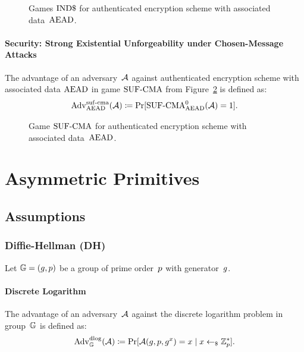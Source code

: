\documentclass[a4paper,orivec]{llncs}
\begin{document}
\begin{figure}[!ht]
    \centering
    \nicoresetlinenr%
    \fbox{%
        \scalebox{\codescalefactor}{%
        }%
    }
    \caption{%
        Games ${\mathrm{IND}\$}$ for authenticated encryption scheme with associated data~$\mathrm{AEAD}$.
    }
    \label{fig:sym:aenc:indd}
\end{figure}

\paragraph{Security: Strong Existential Unforgeability under Chosen-Message Attacks}
The advantage of an adversary~$\mathcal{A}$ against authenticated encryption scheme with associated data $\mathrm{AEAD}$ in game ${\mathrm{SUF}\text{-}\mathrm{CMA}}$ from Figure~\ref{fig:sym:aenc:suf} is defined as:
\[
\mathrm{Adv}_{\mathrm{AEAD}}^{\mathrm{suf}\text{-}\mathrm{cma}}(\mathcal{A})\coloneqq\Pr[{\mathrm{SUF}\text{-}\mathrm{CMA}}_{\mathrm{AEAD}}^0(\mathcal{A})=1]\text{.}
\]

\begin{figure}[!ht]
    \centering
    \nicoresetlinenr%
    \fbox{%
        \scalebox{\codescalefactor}{%
        }%
    }
    \caption{%
        Game ${\mathrm{SUF}\text{-}\mathrm{CMA}}$ for authenticated encryption scheme with associated data~$\mathrm{AEAD}$.
    }
    \label{fig:sym:aenc:suf}
\end{figure}




\section{Asymmetric Primitives}
\label{sec:asym}

\subsection{Assumptions}
\label{sec:asym:assumptions}

\subsubsection{Diffie-Hellman (DH)}
\label{sec:asym:assumptions:dh}
Let $\mathbb{G}=(g,p)$ be a group of prime order~$p$ with generator~$g$.

\paragraph{Discrete Logarithm}
The advantage of an adversary~$\mathcal{A}$ against the discrete logarithm problem in group~$\mathbb{G}$ is defined as:
\[
\mathrm{Adv}_{\mathbb{G}}^{\mathrm{dlog}}(\mathcal{A})\coloneqq\Pr[\mathcal{A}(g,p,g^x)=x\mid x\gets_\$\mathbb{Z}_p^*]\text{.}
\]
\end{document}
